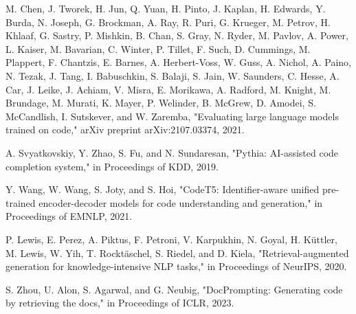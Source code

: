 \documentclass[conference]{IEEEtran}
\begin{document}
\begin{thebibliography}{1}
M. Chen, J. Tworek, H. Jun, Q. Yuan, H. Pinto, J. Kaplan, H. Edwards, Y. Burda, N. Joseph, G. Brockman, A. Ray, R. Puri, G. Krueger, M. Petrov, H. Khlaaf, G. Sastry, P. Mishkin, B. Chan, S. Gray, N. Ryder, M. Pavlov, A. Power, L. Kaiser, M. Bavarian, C. Winter, P. Tillet, F. Such, D. Cummings, M. Plappert, F. Chantzis, E. Barnes, A. Herbert-Voss, W. Guss, A. Nichol, A. Paino, N. Tezak, J. Tang, I. Babuschkin, S. Balaji, S. Jain, W. Saunders, C. Hesse, A. Car, J. Leike, J. Achiam, V. Misra, E. Morikawa, A. Radford, M. Knight, M. Brundage, M. Murati, K. Mayer, P. Welinder, B. McGrew, D. Amodei, S. McCandlish, I. Sutskever, and W. Zaremba, "Evaluating large language models trained on code," arXiv preprint arXiv:2107.03374, 2021.

A. Svyatkovskiy, Y. Zhao, S. Fu, and N. Sundaresan, "Pythia: AI-assisted code completion system," in Proceedings of KDD, 2019.

Y. Wang, W. Wang, S. Joty, and S. Hoi, "CodeT5: Identifier-aware unified pre-trained encoder-decoder models for code understanding and generation," in Proceedings of EMNLP, 2021.

P. Lewis, E. Perez, A. Piktus, F. Petroni, V. Karpukhin, N. Goyal, H. Küttler, M. Lewis, W. Yih, T. Rocktäschel, S. Riedel, and D. Kiela, "Retrieval-augmented generation for knowledge-intensive NLP tasks," in Proceedings of NeurIPS, 2020.

S. Zhou, U. Alon, S. Agarwal, and G. Neubig, "DocPrompting: Generating code by retrieving the docs," in Proceedings of ICLR, 2023.

\end{thebibliography}
\end{document}
